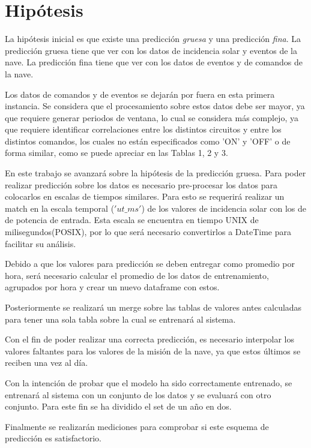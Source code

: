 \documentclass[../Main.tex]{subfiles}
\begin{document}
\section{Hipótesis}
La hipótesis inicial es que existe una predicción \textit{gruesa} y una predicción \textit{fina}. La predicción gruesa tiene que ver con los datos de incidencia solar y eventos de la nave. La predicción fina tiene que ver con los datos de eventos y de comandos de la nave.
\newline \par
Los datos de comandos y de eventos se dejarán por fuera en esta primera instancia. Se considera que el procesamiento sobre estos datos debe ser mayor, ya que requiere generar periodos de ventana, lo cual se considera más complejo, ya que requiere identificar correlaciones entre los distintos circuitos y entre los distintos comandos, los cuales no están especificados como 'ON' y 'OFF' o de forma similar, como se puede apreciar en las Tablas 1, 2 y 3.
\newline \par
En este trabajo se avanzará sobre la hipótesis de la predicción gruesa. Para poder realizar predicción sobre los datos es necesario pre-procesar los datos para colocarlos en escalas de tiempos similares. Para esto se requerirá realizar un match en la escala temporal ($'ut\_ms'$) de los valores de incidencia solar con los de de potencia de entrada. Esta escala se encuentra en tiempo UNIX de milisegundos(POSIX), por lo que será necesario convertirlos a DateTime para facilitar su análisis.
\newline \par
Debido a que los valores para predicción se deben entregar como promedio por hora, será necesario calcular el promedio de los datos de entrenamiento, agrupados por hora y crear un nuevo dataframe con estos.
\newline \par
Posteriormente se realizará un merge sobre las tablas de valores antes calculadas para tener una sola tabla sobre la cual se entrenará al sistema. 
\newline \par
Con el fin de poder realizar una correcta predicción, es necesario interpolar los valores faltantes para los valores de la misión de la nave, ya que estos últimos se reciben una vez al día.
\newline \par
Con la intención de probar que el modelo ha sido correctamente entrenado, se entrenará al sistema con un conjunto de los datos y se evaluará con otro conjunto. Para este fin se ha dividido el set de un año en dos.
\newline \par
Finalmente se realizarán mediciones para comprobar si este esquema de predicción es satisfactorio.
\end{document}
